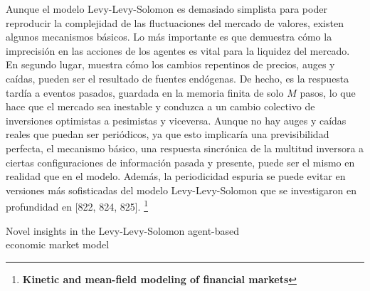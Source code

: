 \documentclass[12pt,a4paper]{article}
\begin{document}
\quad Aunque el modelo Levy-Levy-Solomon es demasiado simplista para poder reproducir la complejidad de las fluctuaciones del mercado de valores, existen algunos mecanismos básicos. Lo más importante es que demuestra cómo la imprecisión en las acciones de los agentes es vital para la liquidez del mercado. En segundo lugar, muestra cómo los cambios repentinos de precios, auges y caídas, pueden ser el resultado de fuentes endógenas. De hecho, es la respuesta tardía a eventos pasados, guardada en la memoria finita de solo $M$ pasos, lo que hace que el mercado sea inestable y conduzca a un cambio colectivo de inversiones optimistas a pesimistas y viceversa. Aunque no hay auges y caídas reales que puedan ser periódicos, ya que esto implicaría una previsibilidad perfecta, el mecanismo básico, una respuesta sincrónica de la multitud inversora a ciertas configuraciones de información pasada y presente, puede ser el mismo en realidad que en el modelo. Además, la periodicidad espuria se puede evitar en versiones más sofisticadas del modelo Levy-Levy-Solomon que se investigaron en profundidad en [822, 824, 825].
\newpage
\footnote{\textbf{Kinetic and mean-field modeling of financial markets}}
\newpage
\begin{center}
Novel insights in the Levy-Levy-Solomon agent-based\\
economic market model
\citep{Beikirch2020}
\end{center}
\end{document}
